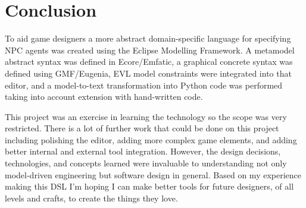 \documentclass[letterpaper,12pt]{article}  %
\begin{document}
\section{Conclusion}
To aid game designers a more abstract domain-specific language for specifying NPC agents was created using the Eclipse Modelling Framework. A metamodel abstract syntax was defined in Ecore/Emfatic, a graphical concrete syntax was defined using GMF/Eugenia, EVL model constraints were integrated into that editor, and a model-to-text transformation into Python code was performed taking into account extension with hand-written code.

This project was an exercise in learning the technology so the scope was very restricted. There is a lot of further work that could be done on this project including polishing the editor, adding more complex game elements, and adding better internal and external tool integration.
However, the design decisions, technologies, and concepts learned were invaluable to understanding not only model-driven engineering but software design in general.
Based on my experience making this DSL I’m hoping I can make better tools for future designers, of all levels and crafts, to create the things they love.





\newpage
\appendix  %



\end{document}
